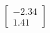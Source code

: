 \documentclass[preview]{standalone}
\begin{document}
\begin{align*}
\begin{bmatrix} -2.34 \\ 1.41 \end{bmatrix}
\end{align*}
\end{document}
